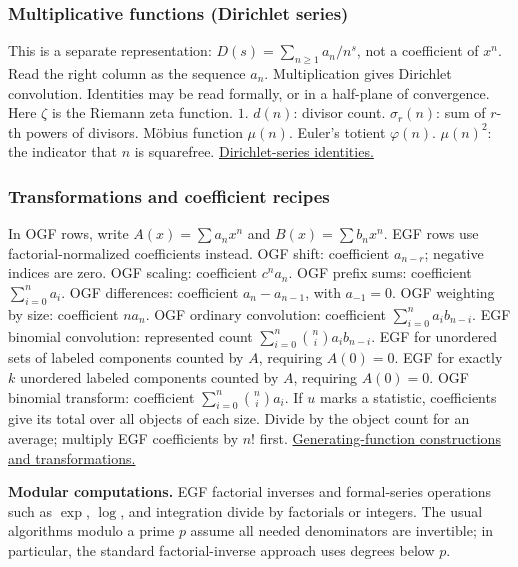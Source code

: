 \subsubsection*{Multiplicative functions (Dirichlet series)}
This is a separate representation:
$D(s)=\sum_{n\ge1}a_n/n^s$, not a coefficient of $x^n$.
Read the right column as the sequence $a_n$. Multiplication gives
Dirichlet convolution. Identities may be read formally, or in a
half-plane of convergence. Here $\zeta$ is the Riemann zeta function.
  {$1$.}
  {$d(n)$: divisor count.}
  {$\sigma_r(n)$: sum of $r$-th powers of divisors.}
  {M\"obius function $\mu(n)$.}
  {Euler's totient $\varphi(n)$.}
  {$\mu(n)^2$: the indicator that $n$ is squarefree.}
\href{https://dlmf.nist.gov/27.4}{Dirichlet-series identities.}

\subsubsection*{Transformations and coefficient recipes}
In OGF rows, write $A(x)=\sum a_nx^n$ and $B(x)=\sum b_nx^n$.
EGF rows use factorial-normalized coefficients instead.
  {OGF shift: coefficient $a_{n-r}$; negative indices are zero.}
  {OGF scaling: coefficient $c^na_n$.}
  {OGF prefix sums: coefficient $\sum_{i=0}^n a_i$.}
  {OGF differences: coefficient $a_n-a_{n-1}$, with $a_{-1}=0$.}
  {OGF weighting by size: coefficient $na_n$.}
  {OGF ordinary convolution: coefficient $\sum_{i=0}^n a_i b_{n-i}$.}
  {EGF binomial convolution: represented count $\sum_{i=0}^n\binom{n}{i}a_i b_{n-i}$.}
  {EGF for unordered sets of labeled components counted by $A$, requiring $A(0)=0$.}
  {EGF for exactly $k$ unordered labeled components counted by $A$, requiring $A(0)=0$.}
  {OGF binomial transform: coefficient $\sum_{i=0}^n\binom{n}{i}a_i$.}
  {If $u$ marks a statistic, coefficients give its total over all objects of each size. Divide by the object count for an average; multiply EGF coefficients by $n!$ first.}
\href{https://aofa.cs.princeton.edu/30gf/}{Generating-function constructions and transformations.}

\medskip
\textbf{Modular computations.} EGF factorial inverses and formal-series
operations such as $\exp$, $\log$, and integration divide by factorials
or integers. The usual algorithms modulo a prime $p$ assume all
needed denominators are invertible; in particular, the standard
factorial-inverse approach uses degrees below $p$.
\par
{}\label{gf:catalog:end}
\endgroup
\clearpage
